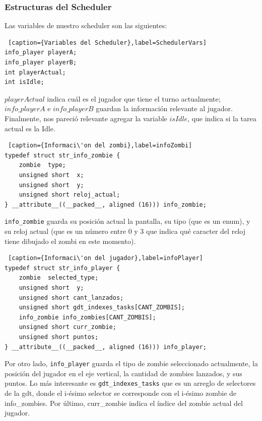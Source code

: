 \subsubsection*{Estructuras del Scheduler}
\par Las variables de nuestro scheduler son las siguientes:

\begin{lstlisting} [caption={Variables del Scheduler},label=SchedulerVars]
info_player playerA;
info_player playerB;
int playerActual;
int isIdle;
\end{lstlisting}

\par $playerActual$ indica cu\'al es el jugador que tiene el turno actualmente; $info\_playerA$ e $info\_playerB$ guardan la informaci\'on relevante al jugador. Finalmente, nos pareci\'o relevante agregar la variable $isIdle$, que indica si la tarea actual es la Idle.

\begin{lstlisting} [caption={Informaci\'on del zombi},label=infoZombi]
typedef struct str_info_zombie {
    zombie  type;
    unsigned short  x;
    unsigned short  y;
    unsigned short reloj_actual;
} __attribute__((__packed__, aligned (16))) info_zombie;
\end{lstlisting}

\par \texttt{info_zombie} guarda su posici\'on actual la pantalla, su tipo (que es un enum), y su reloj actual (que es un n\'umero entre 0 y 3 que indica qu\'e caracter del reloj tiene dibujado el zombi en este momento). 

\begin{lstlisting} [caption={Informaci\'on del jugador},label=infoPlayer]
typedef struct str_info_player {
    zombie  selected_type;
    unsigned short  y;
    unsigned short cant_lanzados;
    unsigned short gdt_indexes_tasks[CANT_ZOMBIS];
    info_zombie info_zombies[CANT_ZOMBIS];
    unsigned short curr_zombie;
    unsigned short puntos;
} __attribute__((__packed__, aligned (16))) info_player;
\end{lstlisting}

\par Por otro lado, \texttt{info_player} guarda el tipo de zombie seleccionado actualmente, la posici\'on del jugador en el eje vertical, la cantidad de zombies lanzados, y sus puntos. Lo m\'as interesante es \texttt{gdt_indexes_tasks} que es un arreglo de selectores de la gdt, donde el i-\'esimo selector se corresponde con el i-\'esimo zombie de info\_zombies. Por \'ultimo, curr\_zombie indica el \'indice del zombie actual del jugador.

